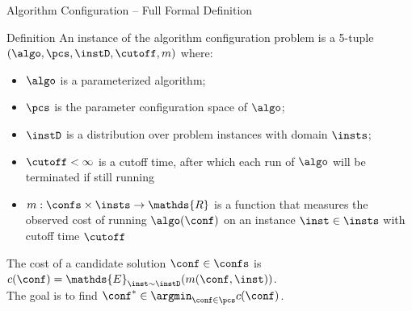 \begin{frame}[c]{Algorithm Configuration -- Full Formal Definition}

\begin{block}{Definition}
An instance of the algorithm configuration problem
is a 5-tuple $(\algo, \pcs, \instD, \cutoff, m)$ where:
\begin{itemize}
  \item $\algo$ is a parameterized algorithm;
  \item $\pcs$ is the parameter configuration space of $\algo$;
  \item $\instD$ is a distribution over problem instances with domain $\insts$;
\pause
  \item $\cutoff < \infty$ is a \alert{cutoff time}, after which each run of $\algo$ will be terminated if still running
\pause
  \item $m: \confs \times \insts \rightarrow \mathds{R}$ is a function that
  measures the observed cost of running $\algo(\conf)$ on an instance $\inst \in
  \insts$ with cutoff time $\cutoff$ 
\end{itemize}
\pause
The cost of a candidate solution $\conf\in\confs$ is
\alert{$c(\conf) = \mathds{E}_{\inst \sim \instD} (m(\conf,\inst))$}.\\
The goal is to find \alert{$\conf^* \in \argmin_{\conf \in \pcs} c(\conf)$}.

\end{block}

\end{frame}


